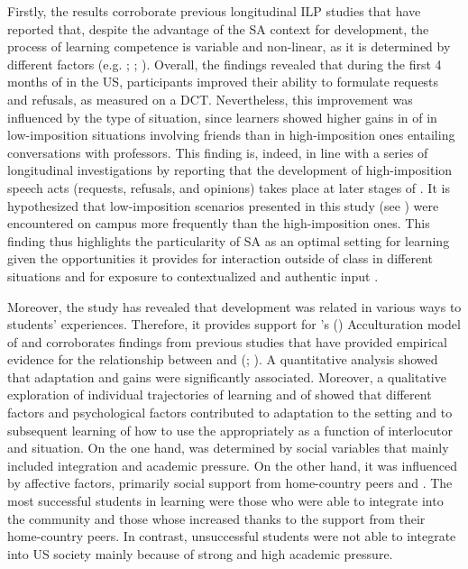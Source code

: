 \documentclass[output=paper]{langsci/langscibook}
\begin{document}
Firstly, the results corroborate previous longitudinal ILP studies that have reported that, despite the advantage of the SA context for  development, the process of learning  competence is variable and non-linear, as it is determined by different factors (e.g. \citealt{Barron2003}; \citealt{Félix-Brasdefer2004}; \citealt{TaguchiRoever2017}). Overall, the findings revealed that during the first 4 months of  in the US, participants improved their ability to formulate requests and refusals, as measured on a DCT. Nevertheless, this improvement was influenced by the type of situation, since learners showed higher gains in  of  in low-imposition situations involving friends than in high-imposition ones entailing conversations with professors. This finding is, indeed, in line with a series of longitudinal investigations by \cite{Taguchi2011, Taguchi2013} reporting that the development of high-imposition  speech acts (requests, refusals, and opinions) takes place at later stages of  . It is hypothesized that low-imposition scenarios presented in this study (see ) were encountered on campus more frequently than the high-imposition ones. This finding thus highlights the particularity of SA as an optimal setting for  learning given the opportunities it provides for interaction outside of class in different situations and for exposure to contextualized and authentic input \citep{Taguchi2015contextually}.

\largerpage
Moreover, the study has revealed that  development was related in various ways to students’  experiences. Therefore, it provides support for \citeauthor{Schumann1978}'s (\citeyear*{Schumann1978,Schumann1986}) Acculturation model of   and corroborates findings from previous studies that have provided empirical evidence for the relationship between  and   (\citealt{Schmidt1983}; \citealt{DörnyeiEtAl2004}). A quantitative analysis showed that  adaptation and  gains were significantly associated. Moreover, a qualitative exploration of individual trajectories of  learning and of  showed that different factors  and psychological factors contributed to adaptation to the  setting and to subsequent learning of how to use the  appropriately as a function of interlocutor and situation. On the one hand,  was determined by social variables that mainly included integration and academic pressure. On the other hand, it was influenced by affective factors, primarily social support from home-country peers and . The most successful students in  learning were those who were able to integrate into the  community and those whose  increased thanks to the support from their home-country peers. In contrast, unsuccessful students were not able to integrate into US society mainly because of strong  and high academic pressure. 
\end{document}

